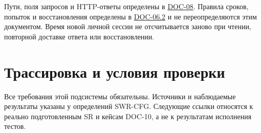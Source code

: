 \documentclass[12pt,a4paper]{article}
\begin{document}
Пути, поля запросов и HTTP-ответы определены в {\href{../09\_Архитектура\_и\_API/DOC-08\_Справочник\_API.pdf\#doc-08-справочник-api-платформы}{DOC-08}}. Правила сроков, попыток и восстановления определены в {\href{DOC-06.2\_Сессии\_задач\_и\_планировщик.pdf\#doc-062-сессии-задач-и-планировщик}{DOC-06.2}} и не переопределяются этим документом. Время новой личной сессии не отсчитывается заново при чтении, повторной доставке ответа или восстановлении.

\section{Трассировка и условия проверки}\label{4-ux442ux440ux430ux441ux441ux438ux440ux43eux432ux43aux430-ux438-ux443ux441ux43bux43eux432ux438ux44f-ux43fux440ux43eux432ux435ux440ux43aux438}

\hypertarget{4-трассировка-и-условия-проверки}{}

Все требования этой подсистемы обязательны. Источники и наблюдаемые результаты указаны у определений SWR-CFG. Следующие ссылки относятся к реально подготовленным SR и кейсам DOC-10, а не к результатам исполнения тестов.
\end{document}
